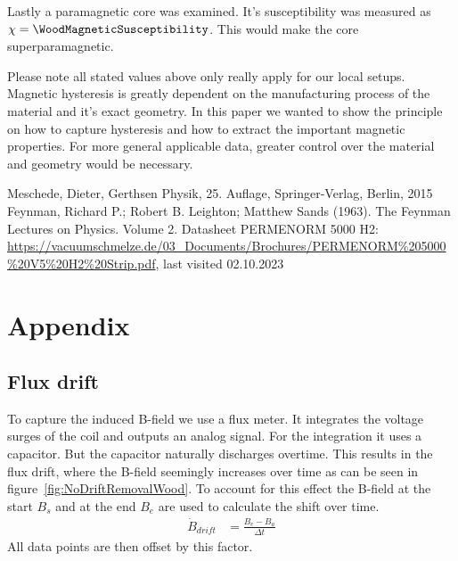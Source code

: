 \documentclass[a4paper,10pt,twocolumn]{article}
\begin{document}
    Lastly a paramagnetic core was examined.
    It's susceptibility was measured as $\chi = \WoodMagneticSusceptibility$.
    This would make the core superparamagnetic.
    
    Please note all stated values above only really apply for our local setups. 
    Magnetic hysteresis is greatly dependent on the manufacturing process of the material and it's exact geometry.
    In this paper we wanted to show the principle on how to capture hysteresis and
    how to extract the important magnetic properties.
    For more general applicable data, greater control over the material and geometry would be necessary.
    
    
    
    \begin{thebibliography}{}    %
         Meschede, Dieter, Gerthsen Physik, 25. Auflage, Springer-Verlag, Berlin, 2015
          Feynman, Richard P.; Robert B. Leighton; Matthew Sands (1963).
        The Feynman Lectures on Physics. Volume 2.
         Datasheet PERMENORM 5000 H2: \url{https://vacuumschmelze.de/03_Documents/Brochures/PERMENORM%205000%20V5%20H2%20Strip.pdf},
        last visited 02.10.2023
    \end{thebibliography}
    
    
    \section{Appendix}

    \subsection{Flux drift}
    \label{subsec:fluxDrift}

    
    To capture the induced B-field we use a flux meter.
    It integrates the voltage surges of the coil and outputs an analog signal.
    For the integration it uses a capacitor.
    But the capacitor naturally discharges overtime.
    This results in the flux drift, where the B-field seemingly increases over time 
    as can be seen in figure~\ref{fig:NoDriftRemovalWood}.
    To account for this effect the B-field at the start $B_s$ and at the end $B_e$ are used to calculate the shift
    over time.
    \begin{align*}
        \dot{B}_{drift} &= \frac{B_e - B_a}{\Delta t}
    \end{align*}
    All data points are then offset by this factor.
    
\end{document}

